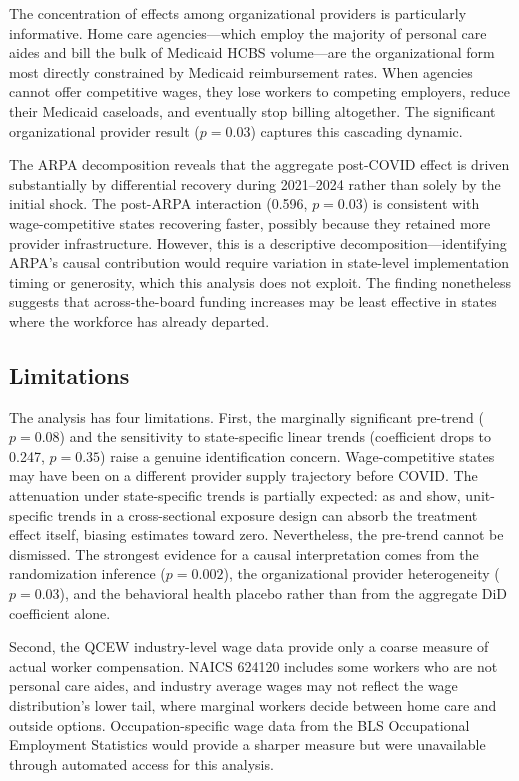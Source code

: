 \documentclass[12pt]{article}
\begin{document}
The concentration of effects among organizational providers is particularly informative. Home care agencies---which employ the majority of personal care aides and bill the bulk of Medicaid HCBS volume---are the organizational form most directly constrained by Medicaid reimbursement rates. When agencies cannot offer competitive wages, they lose workers to competing employers, reduce their Medicaid caseloads, and eventually stop billing altogether. The significant organizational provider result ($p = 0.03$) captures this cascading dynamic.

The ARPA decomposition reveals that the aggregate post-COVID effect is driven substantially by differential recovery during 2021--2024 rather than solely by the initial shock. The post-ARPA interaction (0.596, $p = 0.03$) is consistent with wage-competitive states recovering faster, possibly because they retained more provider infrastructure. However, this is a descriptive decomposition---identifying ARPA's causal contribution would require variation in state-level implementation timing or generosity, which this analysis does not exploit. The finding nonetheless suggests that across-the-board funding increases may be least effective in states where the workforce has already departed.

\subsection{Limitations}

The analysis has four limitations. First, the marginally significant pre-trend ($p = 0.08$) and the sensitivity to state-specific linear trends (coefficient drops to 0.247, $p = 0.35$) raise a genuine identification concern. Wage-competitive states may have been on a different provider supply trajectory before COVID. The attenuation under state-specific trends is partially expected: as \citet{wolfers2006did} and \citet{meer2016effects} show, unit-specific trends in a cross-sectional exposure design can absorb the treatment effect itself, biasing estimates toward zero. Nevertheless, the pre-trend cannot be dismissed. The strongest evidence for a causal interpretation comes from the randomization inference ($p = 0.002$), the organizational provider heterogeneity ($p = 0.03$), and the behavioral health placebo rather than from the aggregate DiD coefficient alone.

Second, the QCEW industry-level wage data provide only a coarse measure of actual worker compensation. NAICS 624120 includes some workers who are not personal care aides, and industry average wages may not reflect the wage distribution's lower tail, where marginal workers decide between home care and outside options. Occupation-specific wage data from the BLS Occupational Employment Statistics would provide a sharper measure but were unavailable through automated access for this analysis.
\end{document}
